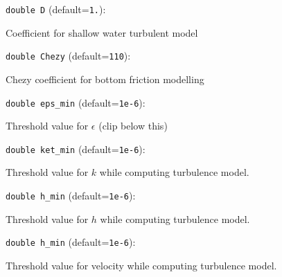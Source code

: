 \item\verb+double D+ {\rm(default=\verb|1.|)}:

Coefficient for shallow water turbulent model

\item\verb+double Chezy+ {\rm(default=\verb|110|)}:

Chezy coefficient for bottom friction modelling

\item\verb+double eps_min+ {\rm(default=\verb|1e-6|)}:

Threshold value for $\epsilon$ (clip below this)

\item\verb+double ket_min+ {\rm(default=\verb|1e-6|)}:

Threshold value for $k$ while computing turbulence model.

\item\verb+double h_min+ {\rm(default=\verb|1e-6|)}:

Threshold value for $h$ while computing turbulence model.

\item\verb+double h_min+ {\rm(default=\verb|1e-6|)}:

Threshold value for velocity while computing turbulence model.

